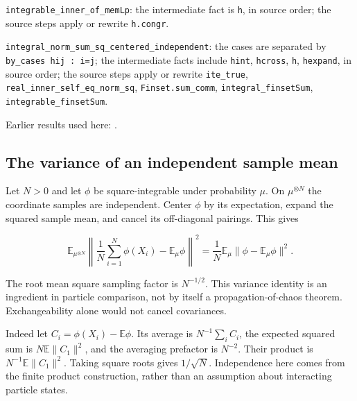 \documentclass[11pt,a4paper]{report}
\begin{document}
\begin{leanbox}
\texttt{integrable\_\allowbreak{}inner\_\allowbreak{}of\_\allowbreak{}mem\allowbreak{}Lp}: the intermediate fact is \texttt{h}, in source order; the source steps apply or rewrite \texttt{h.\allowbreak{}congr}.



\texttt{integral\_\allowbreak{}norm\_\allowbreak{}sum\_\allowbreak{}sq\_\allowbreak{}centered\_\allowbreak{}independent}: the cases are separated by \texttt{by\_\allowbreak{}cases hij : i=j}; the intermediate facts include \texttt{hint}, \texttt{hcross}, \texttt{h}, \texttt{hexpand}, in source order; the source steps apply or rewrite \texttt{ite\_\allowbreak{}true}, \texttt{real\_\allowbreak{}inner\_\allowbreak{}self\_\allowbreak{}eq\_\allowbreak{}norm\_\allowbreak{}sq}, \texttt{Finset.\allowbreak{}sum\_\allowbreak{}comm}, \texttt{integral\_\allowbreak{}finset\allowbreak{}Sum}, \texttt{integrable\_\allowbreak{}finset\allowbreak{}Sum}.
\end{leanbox}


Earlier results used here: \cite[Section~3.11.1]{LangevinLean2026IPLA}.
\subsection{\texorpdfstring{The variance of an independent sample mean}{The variance of an independent sample mean}}
\label{report-step-ProximalLangevin-MeanFieldVariance-lean-2}


Let \(N>0\) and let \(\phi\) be square-integrable under probability \(\mu\). On \(\mu^{\otimes N}\) the coordinate samples are independent. Center \(\phi\) by its expectation, expand the squared sample mean, and cancel its off-diagonal pairings. This gives

\[
\mathbb E_{\mu^{\otimes N}}
 \left\|\frac1N\sum_{i=1}^N\phi(X_i)-\mathbb E_\mu\phi\right\|^2
 =\frac1N\mathbb E_\mu\|\phi-\mathbb E_\mu\phi\|^2.
\]

The root mean square sampling factor is \(N^{-1/2}\). This variance identity is an ingredient in particle comparison, not by itself a propagation-of-chaos theorem. Exchangeability alone would not cancel covariances.



Indeed let \(C_i=\phi(X_i)-\mathbb E\phi\). Its average is \(N^{-1}\sum_iC_i\), the expected squared sum is \(N\mathbb E\|C_1\|^2\), and the averaging prefactor is \(N^{-2}\). Their product is \(N^{-1}\mathbb E\|C_1\|^2\). Taking square roots gives \(1/\sqrt N\). Independence here comes from the finite product construction, rather than an assumption about interacting particle states.
\end{document}
